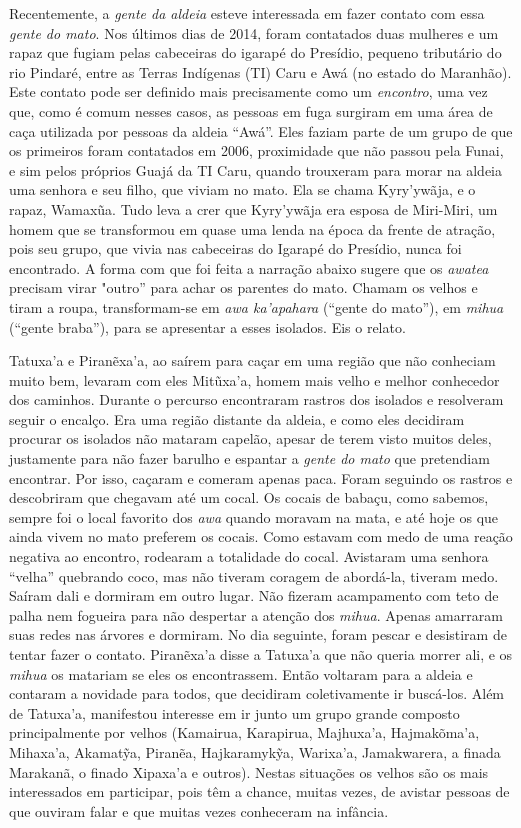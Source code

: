 Recentemente, a \emph{gente da aldeia} esteve interessada em fazer
contato com essa \emph{gente do mato}. Nos últimos dias de 2014, foram
contatados duas mulheres e um rapaz que fugiam pelas cabeceiras do
igarapé do Presídio, pequeno tributário do rio Pindaré, entre as Terras
Indígenas (TI) Caru e Awá (no estado do Maranhão). Este contato pode ser
definido mais precisamente como um \emph{encontro}, uma vez que, como é
comum nesses casos, as pessoas em fuga surgiram em uma área de caça
utilizada por pessoas da aldeia ``Awá''. Eles faziam parte de um grupo
de que os primeiros foram contatados em 2006, proximidade que não passou
pela Funai, e sim pelos próprios Guajá da TI Caru, quando trouxeram para
morar na aldeia uma senhora e seu filho, que viviam no mato. Ela se
chama Kyry'ywãja, e o rapaz, Wamaxũa. Tudo leva a crer que Kyry'ywãja
era esposa de Miri-Miri, um homem que se transformou em quase uma lenda
na época da frente de atração, pois seu grupo, que vivia nas cabeceiras
do Igarapé do Presídio, nunca foi encontrado. A forma com que foi feita
a narração abaixo sugere que os \emph{awatea} precisam virar "outro''
para achar os parentes do mato. Chamam os velhos e tiram a roupa,
transformam-se em \emph{awa ka'apahara} (``gente do mato''), em
\emph{mihua} (``gente braba''), para se apresentar a esses isolados. Eis
o relato.

Tatuxa'a e Piranẽxa'a, ao saírem para caçar em uma região que não
conheciam muito bem, levaram com eles Mitũxa'a, homem mais velho e
melhor conhecedor dos caminhos. Durante o percurso encontraram rastros
dos isolados e resolveram seguir o encalço. Era uma região distante da
aldeia, e como eles decidiram procurar os isolados não mataram capelão,
apesar de terem visto muitos deles, justamente para não fazer barulho e
espantar a \emph{gente do mato} que pretendiam encontrar. Por isso,
caçaram e comeram apenas paca. Foram seguindo os rastros e descobriram
que chegavam até um cocal. Os cocais de babaçu, como sabemos, sempre foi
o local favorito dos \emph{awa} quando moravam na mata, e até hoje os
que ainda vivem no mato preferem os cocais. Como estavam com medo de uma
reação negativa ao encontro, rodearam a totalidade do cocal. Avistaram
uma senhora ``velha'' quebrando coco, mas não tiveram coragem de
abordá-la, tiveram medo. Saíram dali e dormiram em outro lugar. Não
fizeram acampamento com teto de palha nem fogueira para não despertar a
atenção dos \emph{mihua}. Apenas amarraram suas redes nas árvores e
dormiram. No dia seguinte, foram pescar e desistiram de tentar fazer o
contato. Piranẽxa'a disse a Tatuxa'a que não queria morrer ali, e os
\emph{mihua} os matariam se eles os encontrassem. Então voltaram para a
aldeia e contaram a novidade para todos, que decidiram coletivamente ir
buscá-los. Além de Tatuxa'a, manifestou interesse em ir junto um grupo
grande composto principalmente por velhos (Kamairua, Karapirua,
Majhuxa'a, Hajmakõma'a, Mihaxa'a, Akamatỹa, Piranẽa, Hajkaramykỹa,
Warixa'a, Jamakwarera, a finada Marakanã, o finado Xipaxa'a e outros).
Nestas situações os velhos são os mais interessados em participar, pois
têm a chance, muitas vezes, de avistar pessoas de que ouviram falar e
que muitas vezes conheceram na infância.

